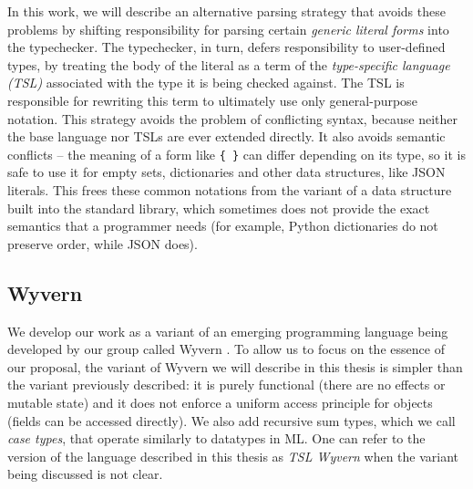 In this work, we will describe an alternative parsing strategy that avoids these problems by shifting responsibility for parsing certain \emph{generic literal forms} into the typechecker. The typechecker, in turn, defers responsibility to user-defined types, by treating the body of the literal as a term of the   \emph{type-specific language (TSL)} associated with the type it is being checked against. The TSL is responsible for rewriting this term to ultimately use only general-purpose notation. This strategy avoids the problem of conflicting syntax, because neither the base language nor TSLs are ever extended directly. It also avoids semantic conflicts -- the meaning of a form like \verb|{ }| can differ depending  on its type, so it is safe to use it for empty sets, dictionaries and other data structures, like JSON literals. This frees these common notations from the variant of a  data structure built into the standard library, which sometimes does not provide the exact semantics that a programmer needs (for example, Python dictionaries do not preserve order, while JSON does).
\subsection{Wyvern}
We develop our work as a variant of an emerging programming language being developed by our group called Wyvern \cite{Nistor:2013:WST:2489828.2489830}. To allow us to focus on the essence of our proposal, the variant of Wyvern we will describe in this thesis is simpler than the variant previously described: it is purely functional (there are no effects or mutable state) and it does not enforce a uniform access principle for objects (fields can be accessed directly). We also add recursive sum types, which we call \emph{case types}, that operate similarly to datatypes in ML. One can refer to the version of the language described in this thesis as \emph{TSL Wyvern} when the variant being discussed is not clear.

